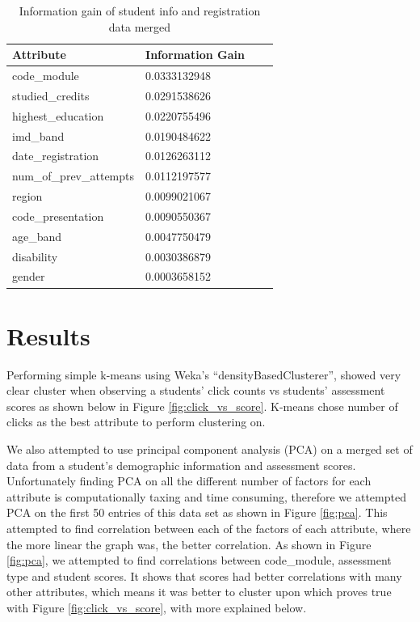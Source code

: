 \documentclass[12pt]{article}
\begin{document}
 
 \begin{table}
\centering
\begin{tabular}{ | l | l | l | p{7.8cm} | }
\hline
\textbf{Attribute} & \textbf{Information Gain} \\
\hline
code\_module & 0.0333132948 \\
\hline
studied\_credits & 0.0291538626 \\
\hline
highest\_education & 0.0220755496 \\
\hline
imd\_band & 0.0190484622 \\
\hline
date\_registration & 0.0126263112 \\
\hline
num\_of\_prev\_attempts & 0.0112197577 \\
\hline
region & 0.0099021067 \\
\hline
code\_presentation & 0.0090550367 \\
\hline
age\_band & 0.0047750479 \\
\hline
disability & 0.0030386879 \\ 
\hline
gender & 0.0003658152 \\
\hline

\end{tabular}
\caption{Information gain of student info and registration data merged}
\label{table:dem_infogain}
\end{table}

\section{Results}

Performing simple k-means using Weka's ``densityBasedClusterer'', showed very clear cluster when observing a students' click counts vs students' assessment scores as shown below in Figure \ref{fig:click_vs_score}.
K-means chose number of clicks as the best attribute to perform clustering on. 

We also attempted to use principal component analysis (PCA) on a merged set of data from a student's demographic information and assessment scores. Unfortunately finding PCA on all the different number of factors for each attribute is computationally taxing and time consuming, therefore we attempted PCA on the first 50 entries of this data set as shown in Figure \ref{fig:pca}. This attempted to find correlation between each of the factors of each attribute, where the more linear the graph was, the better correlation. As shown in Figure \ref{fig:pca}, we attempted to find correlations between code\_module, assessment type and student scores. It shows that scores had better correlations with many other attributes, which means it was better to cluster upon which proves true with Figure \ref{fig:click_vs_score}, with more explained below.
\end{document}
